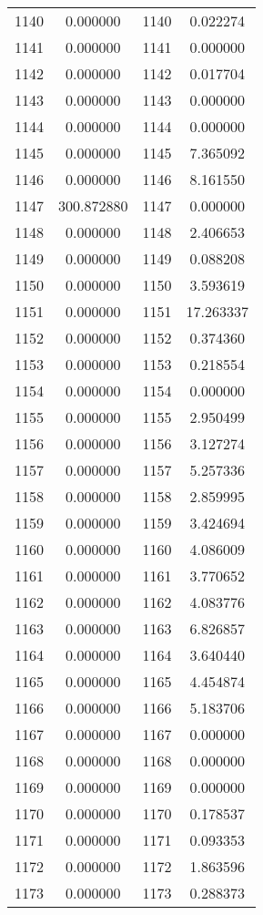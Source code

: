 \documentclass[12pt]{article}
\begin{document}
\begin{longtable}{@{}cccc@{}}
1140 & 0.000000 & 1140 & 0.022274 \\
1141 & 0.000000 & 1141 & 0.000000 \\
1142 & 0.000000 & 1142 & 0.017704 \\
1143 & 0.000000 & 1143 & 0.000000 \\
1144 & 0.000000 & 1144 & 0.000000 \\
1145 & 0.000000 & 1145 & 7.365092 \\
1146 & 0.000000 & 1146 & 8.161550 \\
1147 & 300.872880 & 1147 & 0.000000 \\
1148 & 0.000000 & 1148 & 2.406653 \\
1149 & 0.000000 & 1149 & 0.088208 \\
1150 & 0.000000 & 1150 & 3.593619 \\
1151 & 0.000000 & 1151 & 17.263337 \\
1152 & 0.000000 & 1152 & 0.374360 \\
1153 & 0.000000 & 1153 & 0.218554 \\
1154 & 0.000000 & 1154 & 0.000000 \\
1155 & 0.000000 & 1155 & 2.950499 \\
1156 & 0.000000 & 1156 & 3.127274 \\
1157 & 0.000000 & 1157 & 5.257336 \\
1158 & 0.000000 & 1158 & 2.859995 \\
1159 & 0.000000 & 1159 & 3.424694 \\
1160 & 0.000000 & 1160 & 4.086009 \\
1161 & 0.000000 & 1161 & 3.770652 \\
1162 & 0.000000 & 1162 & 4.083776 \\
1163 & 0.000000 & 1163 & 6.826857 \\
1164 & 0.000000 & 1164 & 3.640440 \\
1165 & 0.000000 & 1165 & 4.454874 \\
1166 & 0.000000 & 1166 & 5.183706 \\
1167 & 0.000000 & 1167 & 0.000000 \\
1168 & 0.000000 & 1168 & 0.000000 \\
1169 & 0.000000 & 1169 & 0.000000 \\
1170 & 0.000000 & 1170 & 0.178537 \\
1171 & 0.000000 & 1171 & 0.093353 \\
1172 & 0.000000 & 1172 & 1.863596 \\
1173 & 0.000000 & 1173 & 0.288373 \\

\end{longtable}
\end{document}
